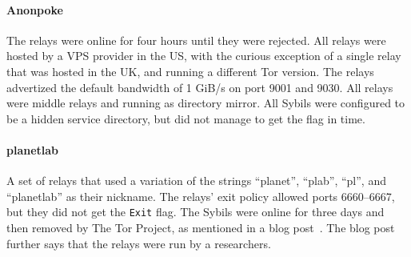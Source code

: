 \paragraph{Anonpoke}
The relays were online for four hours until they were rejected.  All relays were
hosted by a VPS provider in the US, with the curious exception of a single relay
that was hosted in the UK, and running a different Tor version.  The relays
advertized the default bandwidth of 1 GiB/s on port 9001 and 9030.  All relays
were middle relays and running as directory mirror.  All Sybils were configured
to be a hidden service directory, but did not manage to get the flag in time.

\paragraph{planetlab}
A set of relays that used a variation of the strings ``planet'', ``plab'',
``pl'', and ``planetlab'' as their nickname.  The relays' exit policy allowed
ports 6660--6667, but they did not get the \texttt{Exit} flag.  The Sybils were
online for three days and then removed by The Tor Project, as mentioned in a
blog post~\cite{planetlab}.  The blog post further says that the relays were run
by a researchers.
